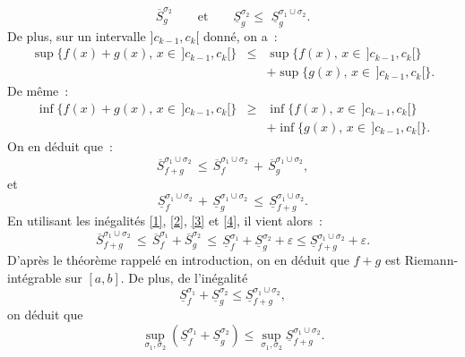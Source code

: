 {\begin{enumerate}
{\begin{equation}
\overline{S}_{g}^{\sigma_{2}}\quad\quad\text{et}\quad\quad
\underline{S}_{g}^{\sigma_{2}}\leq\,\,
\underline{S}_{g}^{\sigma_{1}\cup\sigma_{2}}.
\end{equation}
De plus, sur un intervalle $]c_{k-1}, c_{k}[$ donn\'e, on a~:
\begin{eqnarray*}
\sup\{f(x) + g(x), \,x \in \,]c_{k-1}, c_{k}[\} &\leq &
\sup\{f(x), \,x \in \,]c_{k-1}, c_{k}[\} \\& &+ \sup\{g(x), \,x
\in \,]c_{k-1}, c_{k}[\}.
\end{eqnarray*}
De m\^eme~:
\begin{eqnarray*}
\inf\{f(x) + g(x), \,x \in \,]c_{k-1}, c_{k}[\} & \geq &
\inf\{f(x),\,x \in \,]c_{k-1}, c_{k}[\}\\ & & + \inf\{g(x), \,x
\in \,]c_{k-1}, c_{k}[\}.
\end{eqnarray*}
On en d\'eduit que~:
\begin{equation}\label{3}
\overline{S}_{f+g}^{\sigma_{1}\cup\sigma_{2}} \,\leq\,
\overline{S}_{f}^{\sigma_{1}\cup\sigma_{2}}\,+\,\overline{S}_{g}^{\sigma_{1}\cup\sigma_{2}},
\end{equation}
et
\begin{equation}\label{4}
\underline{S}_{f}^{\sigma_{1}\cup\sigma_{2}}\,+\,
\underline{S}_{g}^{\sigma_{1}\cup\sigma_{2}} \,\leq\,
\underline{S}_{f+g}^{\sigma_{1}\cup\sigma_{2}}.
\end{equation}
En utilisant les in\'egalit\'es \eqref{1}, \eqref{2}, \eqref{3} et
\eqref{4}, il vient alors~:
\begin{equation*}
\overline{S}_{f+g}^{\sigma_{1}\cup\sigma_{2}}\,\leq\,
\overline{S}_{f}^{\sigma_{1}}+
\overline{S}_{g}^{\sigma_{2}}\,\leq\,
\underline{S}_{f}^{\sigma_{1}} + \underline{S}_{g}^{\sigma_{2}} +
\varepsilon \leq \underline{S}_{f+g}^{\sigma_{1}\cup\sigma_{2}} +
\varepsilon.
\end{equation*}
D'apr\`es le th\'eor\`eme rappel\'e en introduction, on en d\'eduit que $f+g$ est
Riemann-int\'egrable sur $[a, b]$. De plus, de l'in\'egalit\'e
\begin{equation*}
\underline{S}_{f}^{\sigma_{1}} + \underline{S}_{g}^{\sigma_{2}}
\leq \underline{S}_{f+g}^{\sigma_{1}\cup\sigma_{2}},
\end{equation*}
on d\'eduit que
\begin{equation*}
\sup_{\sigma_1, \sigma_{2}}\left(\underline{S}_{f}^{\sigma_{1}} +
\underline{S}_{g}^{\sigma_{2}} \right) \leq \sup_{\sigma_1,
\sigma_{2}}\underline{S}_{f+g}^{\sigma_{1}\cup\sigma_{2}}.
\end{equation*}
}
\end{enumerate}}
